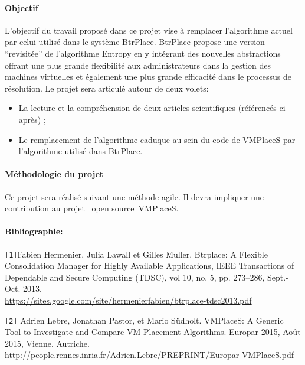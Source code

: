 \documentclass[a4paper,11pt]{article}
\begin{document}
\begin{note}
 

\paragraph*{Objectif\\}
L'objectif du travail proposé dans ce projet vise à remplacer l'algorithme
actuel par celui utilisé dans le système BtrPlace. BtrPlace propose une version
``revisitée'' de l'algorithme Entropy en y intégrant des nouvelles abstractions
offrant une plus grande flexibilité aux administrateurs dans la gestion des
machines virtuelles et également une plus grande efficacité dans le processus de résolution.
Le projet sera articulé autour de deux volets: 
\begin{itemize}
\item La lecture et la compréhension de deux articles scientifiques (référencés ci-après) ; 
\item Le remplacement de l'algorithme caduque au sein du code de VMPlaceS par l'algorithme utilisé dans BtrPlace.
\end{itemize}

\paragraph*{Méthodologie du projet\\}
Ce projet sera réalisé suivant une méthode agile. Il devra impliquer une
contribution au projet \og~open source~\fg VMPlaceS.


\paragraph*{Bibliographie:\\}
%
\texttt{[1]}Fabien Hermenier, Julia Lawall et Gilles Muller. 
Btrplace: A Flexible Consolidation Manager for Highly Available Applications, IEEE Transactions of Dependable and Secure Computing (TDSC), vol 10, no. 5, pp. 273--286, Sept.-Oct. 2013.\\
\href{https://sites.google.com/site/hermenierfabien/btrplace-tdsc2013.pdf}{https://sites.google.com/site/hermenierfabien/btrplace-tdsc2013.pdf}

\texttt{[2]} Adrien Lebre, Jonathan Pastor, et Mario Südholt. VMPlaceS: A Generic Tool to Investigate and Compare VM Placement Algorithms. Europar 2015, Août 2015, Vienne, Autriche.\\
\href{http://people.rennes.inria.fr/Adrien.Lebre/PREPRINT/Europar-VMPlaceS.pdf}{http://people.rennes.inria.fr/Adrien.Lebre/PREPRINT/Europar-VMPlaceS.pdf}
\end{note}
\end{document}
